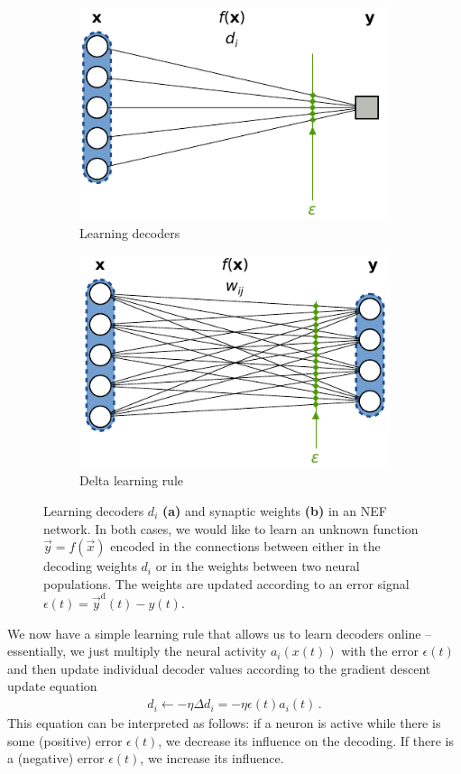 \documentclass[10pt,letterpaper,oneside]{article}
\begin{document}
\begin{figure}
	\centering%
	\begin{subfigure}{0.5\textwidth}%
		\centering%
		\includegraphics{media/pes_network_a.pdf}%
		\caption{Learning decoders}%
	\end{subfigure}%
	\begin{subfigure}{0.5\textwidth}%
		\centering%
		\includegraphics{media/pes_network_b.pdf}%
		\caption{Delta learning rule}%
	\end{subfigure}%
	\caption{Learning decoders $d_i$ \textbf{(a)} and synaptic weights \textbf{(b)} in an NEF network. In both cases, we would like to learn an unknown function $\vec y = f(\vec x)$ encoded in the connections between either in the decoding weights $d_i$ or in the weights between two neural populations. The weights are updated according to an error signal $\epsilon(t) = \vec y^\mathrm{d}(t) - y(t)$.}
\end{figure}

We now have a simple learning rule that allows us to learn decoders online -- essentially, we just multiply the neural activity $a_i(x(t))$ with the error $\epsilon(t)$ and then update individual decoder values according to the gradient descent update equation
\begin{align*}
	d_i \gets -\eta \Delta d_i = -\eta \epsilon(t) a_i(t) \,.
\end{align*}
This equation can be interpreted as follows: if a neuron is active while there is some (positive) error $\epsilon(t)$, we decrease its influence on the decoding. If there is a (negative) error $\epsilon(t)$, we increase its influence.
\end{document}
